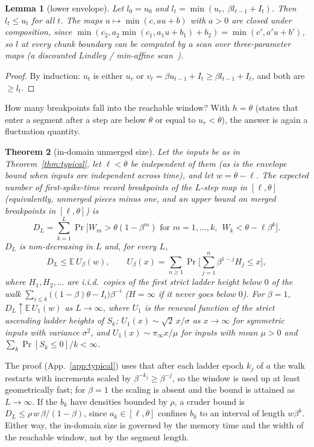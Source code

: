 \documentclass[10pt]{article}
\newtheorem{theorem}{Theorem}
\newtheorem{lemma}[theorem]{Lemma}
\theoremstyle{remark}
\begin{document}
\begin{lemma}[lower envelope]
\label{lem:env}
Let $l_0=u_0$ and $l_t=\min(u_r,\ \beta l_{t-1}+I_t)$. Then $l_t\le u_t$ for all $t$. The maps $u\mapsto\min(c,au+b)$ with $a>0$ are closed under composition, since $\min(c_2,a_2\min(c_1,a_1u+b_1)+b_2)=\min(c',a'u+b')$, so $l$ at every chunk boundary can be computed by a scan over three-parameter maps (a discounted Lindley / min-affine scan~\citep{lindley1952,greenberg1991,baccelli1992}).
\end{lemma}
\begin{proof}
By induction: $u_t$ is either $u_r$ or $v_t=\beta u_{t-1}+I_t\ge\beta l_{t-1}+I_t$, and both are $\ge l_t$.
\end{proof}

How many breakpoints fall into the reachable window? With $h=\theta$ (states that enter a segment after a step are below $\theta$ or equal to $u_r<\theta$), the answer is again a fluctuation quantity.

\begin{theorem}[in-domain unmerged size]
\label{thm:indomain}
Let the inputs be as in Theorem~\ref{thm:typical}, let $\ell<\theta$ be independent of them (as is the envelope bound when inputs are independent across time), and let $w=\theta-\ell$. The expected number of first-spike-time record breakpoints of the $L$-step map in $[\ell,\theta]$ (equivalently, unmerged pieces minus one, and an upper bound on merged breakpoints in $[\ell,\theta]$) is
\[D_L=\sum_{k=1}^{L}\Pr\big[W_m>\theta(1-\beta^m)\text{ for }m=1,\dots,k,\ \ W_k<\theta-\ell\beta^k\big].\]
$D_L$ is non-decreasing in $L$ and, for every $L$,
\[D_L\le\mathbb E\,U_\beta(w),\qquad U_\beta(x)=\sum_{n\ge1}\Pr\Big[\sum_{j=1}^n\beta^{1-j}H_j\le x\Big],\]
where $H_1,H_2,\ldots$ are i.i.d.\ copies of the first strict ladder height below $0$ of the walk $\sum_{i\le k}\big((1-\beta)\theta-I_i\big)\beta^{-i}$ ($H=\infty$ if it never goes below $0$). For $\beta=1$, $D_L\uparrow\mathbb E\,U_1(w)$ as $L\to\infty$, where $U_1$ is the renewal function of the strict ascending ladder heights of $S_k$; $U_1(x)\sim\sqrt2\,x/\sigma$ as $x\to\infty$ for symmetric inputs with variance $\sigma^2$, and $U_1(x)\sim\pi_\infty x/\mu$ for inputs with mean $\mu>0$ and $\sum_k\Pr[S_k\le0]/k<\infty$.
\end{theorem}

The proof (App.~\ref{app:typical}) uses that after each ladder epoch $k_j$ of $a$ the walk restarts with increments scaled by $\beta^{-k_j}\ge\beta^{-j}$, so the window is used up at least geometrically fast; for $\beta=1$ the scaling is absent and the bound is attained as $L\to\infty$. If the $b_k$ have densities bounded by $\rho$, a cruder bound is $D_L\le\rho\,w\,\beta/(1-\beta)$, since $a_k\in[\ell,\theta]$ confines $b_k$ to an interval of length $w\beta^k$. Either way, the in-domain size is governed by the memory time and the width of the reachable window, not by the segment length.
\end{document}
